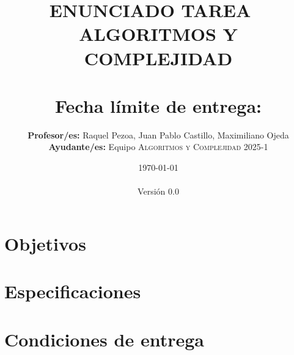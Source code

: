 \documentclass[10pt,spanish]{article} %
\title{
  \huge
  \textbf{ENUNCIADO TAREA \tnum~ \\ ALGORITMOS Y COMPLEJIDAD} \\[1ex]
  \emph{\textquote{Encontrando Diferencias entre dos Secuencias}} \\[1ex]
  {\normalsize Fecha límite de entrega: \tcm{\deadline}}\\
  }
\author{
  \textbf{Profesor/es:} 
        Raquel Pezoa, Juan Pablo Castillo, Maximiliano Ojeda\\
  \textbf{Ayudante/es:} 
        Equipo \textsc{Algoritmos y Complejidad} 2025-1
}
\date{
  \small
  \today\\
  \currenttime\\
  Versión 0.0
}
\begin{document}
\maketitle
\thispagestyle{fancy} %
\vspace{-1.0\baselineskip}

\setlength{\epigraphwidth}{0.7\textwidth}



\setcounter{tocdepth}{2}
\tableofcontents


\section{Objetivos}



\section{Especificaciones}



\newpage

\section{Condiciones de entrega}


\newpage

\printbibliography
\end{document}
